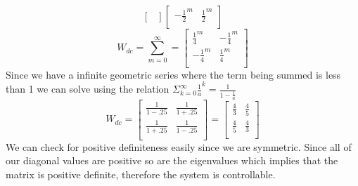 \documentclass{article}
\begin{document}
\begin{enumerate}[a.]
$$\begin{bmatrix}
\end{bmatrix}
\begin{bmatrix}
-\frac{1}{2}^m & \frac{1}{2}^m \\
\end{bmatrix}
$$
$$
W_{dc} = \sum_{m=0}^{\infty}
=
\begin{bmatrix}
 \frac{1}{4}^m & -\frac{1}{4}^m \\
-\frac{1}{4}^m &  \frac{1}{4}^m \\
\end{bmatrix}
$$
Since we have a infinite geometric series where the term being summed is less than 1 we can solve using the relation $\Sigma_{k=0}^\infty\frac{1}{a}^k = \frac{1}{1-\frac{1}{a}}$
$$ W_{dc} =
\begin{bmatrix}
\frac{1}{1-.25} & \frac{1}{1+.25} \\
\frac{1}{1+.25} & \frac{1}{1-.25} \\
\end{bmatrix}
=
\begin{bmatrix}
\frac{4}{3} & \frac{4}{5} \\
\frac{4}{5} & \frac{4}{3} \\
\end{bmatrix}
$$
We can check for positive definiteness easily since we are symmetric.
Since all of our diagonal values are positive so are the eigenvalues which implies that the matrix is positive definite, therefore the system is controllable.


\end{enumerate}
\end{document}
